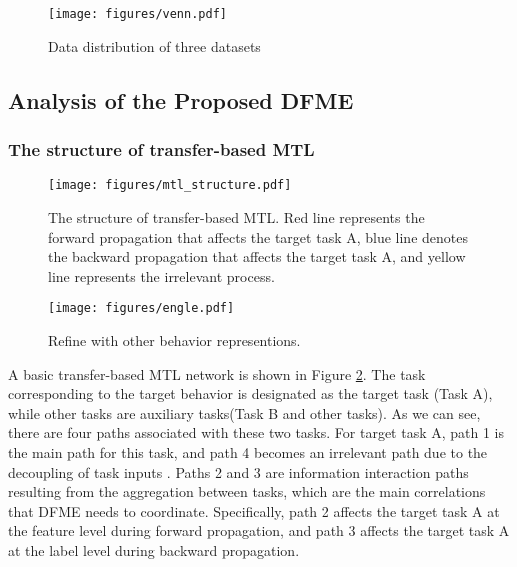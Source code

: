 \begin{figure}[H]
	\centering
	\setlength{\belowcaptionskip}{0cm}
	\setlength{\abovecaptionskip}{0cm}
	\texttt{[image: figures/venn.pdf]}
	\caption{Data distribution of three datasets}
	\label{fig:label_venn}
	\vspace{-4mm}
\end{figure}

\subsection{Analysis of the Proposed DFME}
\subsubsection{The structure of transfer-based MTL}
\label{classical_mtl}

\begin{figure}[H]
	\centering
	\setlength{\belowcaptionskip}{0cm}
	\setlength{\abovecaptionskip}{0cm}
	\texttt{[image: figures/mtl\_structure.pdf]}
	\caption{The structure of transfer-based MTL. Red line represents the forward propagation that affects the target task A, blue line denotes the backward propagation that affects the target task A, and yellow line represents the irrelevant process.}
	\label{fig:mtl_structure}
	\vspace{-4mm}
\end{figure}

\begin{figure*}[ht]
	\centering
	\setlength{\belowcaptionskip}{0cm}
	\setlength{\abovecaptionskip}{0cm}
	\texttt{[image: figures/engle.pdf]}
	\caption{Refine with other behavior representions.}
	\label{fig:engle}
	\vspace{-4mm}
\end{figure*}

A basic transfer-based MTL network is shown in Figure \ref{fig:mtl_structure}. The task corresponding to the target behavior is designated as the target task (Task A), while other tasks are auxiliary tasks(Task B and other tasks). As we can see, there are four paths associated with these two tasks. For target task A, path 1 is the main path for this task, and path 4 becomes an irrelevant path due to the decoupling of task inputs \cite{pkef}. Paths 2 and 3 are information interaction paths resulting from the aggregation between tasks, which are the main correlations that DFME needs to coordinate. Specifically, path 2 affects the target task A at the feature level during forward propagation, and path 3 affects the target task A at the label level during backward propagation.

